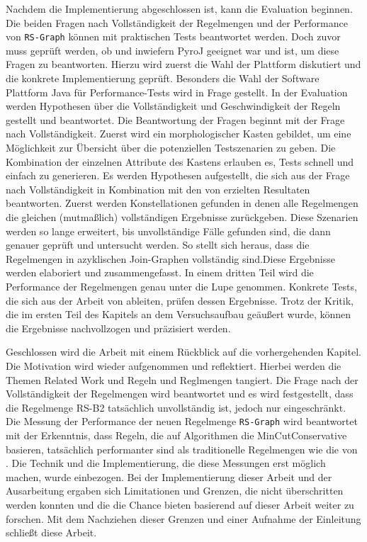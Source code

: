 Nachdem die Implementierung abgeschlossen ist, kann die Evaluation beginnen. Die beiden Fragen nach Vollständigkeit der Regelmengen und der Performance von \texttt{RS-Graph} können mit praktischen Tests beantwortet werden. Doch zuvor muss geprüft werden, ob und inwiefern PyroJ geeignet war und ist, um diese Fragen zu beantworten. Hierzu wird zuerst die Wahl  der Plattform diskutiert und die konkrete Implementierung geprüft. Besonders die Wahl der Software Plattform Java für Performance-Tests wird in Frage gestellt. In der Evaluation werden Hypothesen über die Vollständigkeit und Geschwindigkeit der Regeln gestellt und beantwortet. Die Beantwortung der Fragen beginnt mit der Frage nach Vollständigkeit. Zuerst wird ein morphologischer Kasten gebildet, um eine Möglichkeit zur Übersicht über die potenziellen Testszenarien zu geben. Die Kombination der einzelnen Attribute des Kastens erlauben es, Tests schnell und einfach zu generieren. Es werden Hypothesen aufgestellt, die sich aus der Frage nach Vollständigkeit in Kombination mit den von \cite{shanbhag2014optimizing} erzielten Resultaten  beantworten. Zuerst werden Konstellationen gefunden in denen alle Regelmengen die gleichen (mutmaßlich) vollständigen Ergebnisse zurückgeben. Diese Szenarien werden so lange erweitert, bis unvollständige Fälle gefunden sind, die dann genauer geprüft und untersucht werden. So stellt sich heraus, dass die Regelmengen in azyklischen Join-Graphen vollständig sind.Diese Ergebnisse werden elaboriert und zusammengefasst. In einem dritten Teil wird die Performance der Regelmengen genau unter die Lupe genommen. Konkrete Tests, die sich aus der Arbeit von \cite{shanbhag2014optimizing} ableiten, prüfen dessen Ergebnisse. Trotz der Kritik, die im ersten Teil des Kapitels an dem Versuchsaufbau geäußert wurde, können die Ergebnisse nachvollzogen und präzisiert werden.

Geschlossen wird die Arbeit mit einem Rückblick auf die vorhergehenden Kapitel. Die Motivation wird wieder aufgenommen und reflektiert. Hierbei werden die Themen Related Work und Regeln und Reglmengen tangiert. Die Frage nach der Vollständigkeit der Regelmengen wird beantwortet und es wird festgestellt, dass die Regelmenge RS-B2 tatsächlich unvollständig ist, jedoch nur eingeschränkt. Die Messung der Performance der neuen Regelmenge \texttt{RS-Graph} wird beantwortet mit der Erkenntnis, dass Regeln, die auf Algorithmen die MinCutConservative basieren, tatsächlich performanter sind als traditionelle Regelmengen wie die von \cite{pellenkoft1997complexity}. Die Technik und die Implementierung, die diese Messungen erst möglich machen, wurde einbezogen. Bei der Implementierung dieser Arbeit und der Ausarbeitung ergaben sich Limitationen und Grenzen, die nicht überschritten werden konnten und die die Chance bieten basierend auf dieser Arbeit weiter zu forschen. Mit dem Nachziehen dieser Grenzen und einer Aufnahme der Einleitung schließt diese Arbeit.